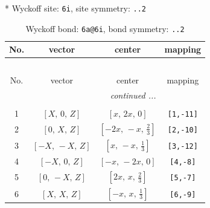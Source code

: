 \documentclass[fleqn,8pt]{jsarticle}
\begin{document}
* Wyckoff site: {\tt 6i}, site symmetry: {\tt ..2}
\renewcommand{\arraystretch}{1.2}
\begin{longtable}{cccc}
\caption{Wyckoff bond: {\tt 6a@6i}, bond symmetry: {\tt ..2}}
 \\
 \hline \hline
No. & vector & center & mapping \\ \hline \endfirsthead

\multicolumn{3}{l}{\tablename\ \thetable{}} \\
 \hline \hline
No. & vector & center & mapping \\ \hline \endhead

 \hline \hline
\multicolumn{3}{r}{\footnotesize\it continued ...} \\ \endfoot

 \hline \hline
\multicolumn{3}{r}{} \\ \endlastfoot

1 & $\left[ X,\, 0,\, Z \right]$ & $\left[ x,\, 2 x,\, 0 \right]$ & {\tt [1,-11]} \\ \hline
2 & $\left[ 0,\, X,\, Z \right]$ & $\left[ - 2 x,\, - x,\, \frac{2}{3} \right]$ & {\tt [2,-10]} \\ \hline
3 & $\left[ - X,\, - X,\, Z \right]$ & $\left[ x,\, - x,\, \frac{1}{3} \right]$ & {\tt [3,-12]} \\ \hline
4 & $\left[ - X,\, 0,\, Z \right]$ & $\left[ - x,\, - 2 x,\, 0 \right]$ & {\tt [4,-8]} \\ \hline
5 & $\left[ 0,\, - X,\, Z \right]$ & $\left[ 2 x,\, x,\, \frac{2}{3} \right]$ & {\tt [5,-7]} \\ \hline
6 & $\left[ X,\, X,\, Z \right]$ & $\left[ - x,\, x,\, \frac{1}{3} \right]$ & {\tt [6,-9]} \\
\end{longtable}
\renewcommand{\arraystretch}{1.2}
\end{document}
